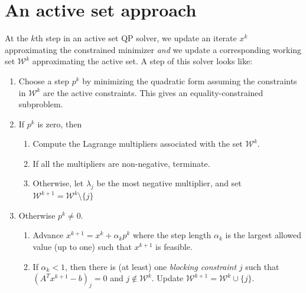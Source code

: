 \documentclass[12pt, leqno]{article} %
\providecommand{\tightlist}{%
  \setlength{\itemsep}{0pt}\setlength{\parskip}{0pt}}
\begin{document}
\section{An active set approach}

At the \(k\)th step in an active set QP solver, we update an iterate
\(x^k\) approximating the constrained minimizer \emph{and} we update a
corresponding working set \(\mathcal{W}^k\) approximating the active
set. A step of this solver looks like:

\begin{enumerate}
\def\labelenumi{\arabic{enumi}.}
\tightlist
\item
  Choose a step \(p^k\) by minimizing the quadratic form assuming the
  constraints in \(\mathcal{W}^k\) are the active constraints. This
  gives an equality-constrained subproblem.
\item
  If \(p^k\) is zero, then

  \begin{enumerate}
  \def\labelenumii{\arabic{enumii}.}
  \tightlist
  \item
    Compute the Lagrange multipliers associated with the set
    \(\mathcal{W}^k\).
  \item
    If all the multipliers are non-negative, terminate.
  \item
    Otherwise, let \(\lambda_j\) be the most negative multiplier, and
    set \(\mathcal{W}^{k+1} = \mathcal{W}^k \setminus \{ j \}\)
  \end{enumerate}
\item
  Otherwise \(p^k \neq 0\).

  \begin{enumerate}
  \def\labelenumii{\arabic{enumii}.}
  \tightlist
  \item
    Advance \(x^{k+1} = x^k + \alpha_k p^k\) where the step length
    \(\alpha_k\) is the largest allowed value (up to one) such that
    \(x^{k+1}\) is feasible.
  \item
    If \(\alpha_k < 1\), then there is (at least) one \emph{blocking
    constraint} \(j\) such that \((A^T x^{k+1}-b)_j = 0\) and
    \(j \not \in \mathcal{W}^k\). Update
    \(\mathcal{W}^{k+1} = \mathcal{W}^k \cup \{ j \}\).
  \end{enumerate}
\end{enumerate}
\end{document}
